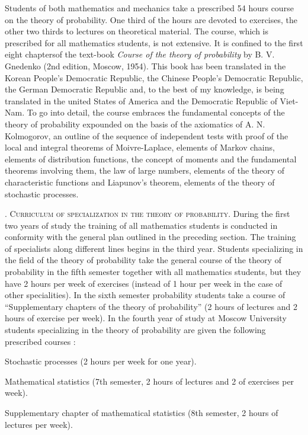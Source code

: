 Students of both mathematics and mechanics take a prescribed 54 hours
course on the theory of probability. One third of the hours are
devoted to exercises, the other two thirds to lectures on theoretical
material. The course, which is prescribed for all mathematics
students, is not extensive. It is confined to the first eight
chapters\pageoriginale of the text-book \textit{Course of the theory
  of probability} by B. V. Gnedenko (2nd edition, Moscow, 1954). This
book has been translated in the Korean People's Democratic Republic,
the Chinese People's Democratic Republic, the German Democratic
Republic and, to the best of my knowledge, is being translated in the
united States of America and the Democratic Republic of Viet-Nam. To
go into detail, the course embraces the fundamental concepts of the
theory of probability expounded on the basis of the axiomatics of
A. N. Kolmogorov, an outline of the sequence of independent tests with
proof of the local and integral theorems of Moivre-Laplace, elements
of Markov chains, elements of distribution functions, the concept of
moments and the fundamental theorems involving them, the law of large
numbers, elements of the theory of characteristic functions and
Liapunov's theorem, elements of the theory of stochastic processes.

\bigskip
{}. \textsc{Curriculum of specialization in the theory of probability.}
 During the first two years of study the training of all mathematics
 students is conducted in conformity with the general plan outlined
 in the preceding section. The training of specialists along different
 lines begins in the third year. Students specializing in the field of
 the theory of probability take the general course of the theory of
 probability in the fifth semester together with all mathematics
 students, but they have 2 hours per week of exercises (instead of 1
 hour per week in the case of other specialities). In the sixth
 semester probability students take a course of ``Supplementary
 chapters of the theory of probability'' (2 hours of lectures and 2
 hours of exercise per week). In the fourth year of study at Moscow
 University students specializing in the theory of probability are
 given the following prescribed courses :

Stochastic processes (2 hours per week for one year).

Mathematical statistics (7th semester, 2 hours of lectures and 2 of
exercises per week).

Supplementary chapter of mathematical statistics (8th semester, 2
hours of lectures per week).

